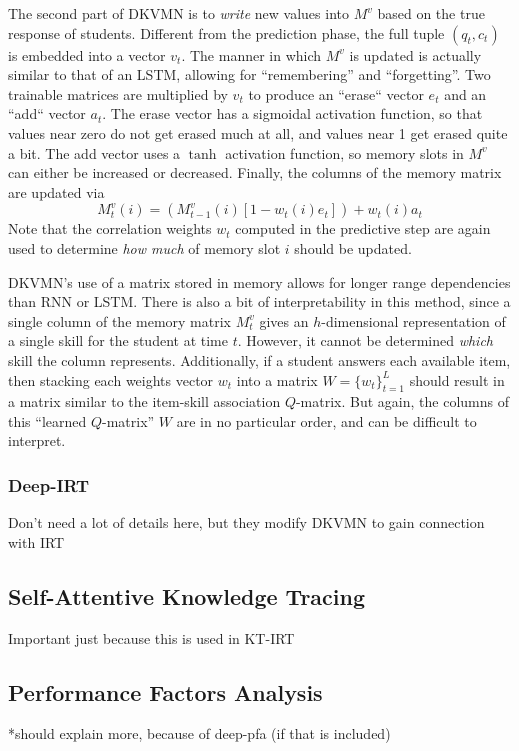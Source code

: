 The second part of DKVMN is to \textit{write} new values into $M^v$ based on the true response of students. Different from the prediction phase, the full tuple $(q_t,c_t)$ is embedded into a vector $v_t$. The manner in which $M^v$ is updated is actually similar to that of an LSTM, allowing for ``remembering'' and ``forgetting''. Two trainable matrices are multiplied by $v_t$ to produce an ``erase`` vector $e_t$ and an ``add`` vector $a_t$. The erase vector has a sigmoidal activation function, so that values near zero do not get erased much at all, and values near 1 get erased quite a bit. The add vector uses a $\tanh$ activation function, so memory slots in $M^v$ can either be increased or decreased. Finally, the columns of the memory matrix are updated via
\begin{equation}
  M_{t}^v(i) = (M_{t-1}^v(i) [1 - w_t(i) e_t] ) + w_t(i) a_t
  \label{eq:update_dkvmn}
\end{equation}
Note that the correlation weights $w_t$ computed in the predictive step are again used to determine \textit{how much} of memory slot $i$ should be updated.


DKVMN's use of a matrix stored in memory allows for longer range dependencies than RNN or LSTM. There is also a bit of interpretability in this method, since a single column of the memory matrix $M_t^v$ gives an $h$-dimensional representation of a single skill for the student at time $t$. However, it cannot be determined \textit{which} skill the column represents. Additionally, if a student answers each available item, then stacking each weights vector $w_t$ into a matrix $W = \{w_t\}_{t=1}^L$ should result in a matrix similar to the item-skill association $Q$-matrix. But again, the columns of this ``learned $Q$-matrix'' $W$ are in no particular order, and can be difficult to interpret.

\subsubsection{Deep-IRT}
Don't need a lot of details here, but they modify DKVMN to gain connection with IRT

\subsection{Self-Attentive Knowledge Tracing}
Important just because this is used in KT-IRT

\subsection{Performance Factors Analysis}
*should explain more, because of deep-pfa (if that is included)



